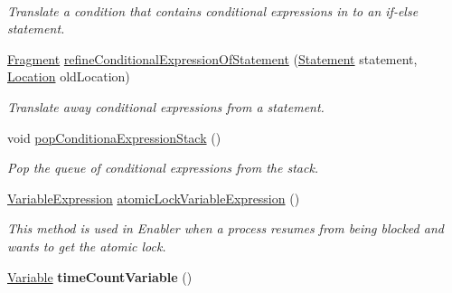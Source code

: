 \begin{DoxyCompactItemize}
$$\begin{DoxyCompactList}\small\item\em Translate a condition that contains conditional expressions in to an if-\/else statement. \end{DoxyCompactList}\item 
\hyperlink{interfaceedu_1_1udel_1_1cis_1_1vsl_1_1civl_1_1model_1_1IF_1_1Fragment}{Fragment} \hyperlink{classedu_1_1udel_1_1cis_1_1vsl_1_1civl_1_1model_1_1common_1_1CommonModelFactory_a5c6a5fb83b334a34cbac1a87f737eae2}{refine\+Conditional\+Expression\+Of\+Statement} (\hyperlink{interfaceedu_1_1udel_1_1cis_1_1vsl_1_1civl_1_1model_1_1IF_1_1statement_1_1Statement}{Statement} statement, \hyperlink{interfaceedu_1_1udel_1_1cis_1_1vsl_1_1civl_1_1model_1_1IF_1_1location_1_1Location}{Location} old\+Location)
\begin{DoxyCompactList}\small\item\em Translate away conditional expressions from a statement. \end{DoxyCompactList}\item 
void \hyperlink{classedu_1_1udel_1_1cis_1_1vsl_1_1civl_1_1model_1_1common_1_1CommonModelFactory_a09569651a5c0328eae90a774679e2620}{pop\+Conditiona\+Expression\+Stack} ()
\begin{DoxyCompactList}\small\item\em Pop the queue of conditional expressions from the stack. \end{DoxyCompactList}\item 
\hyperlink{interfaceedu_1_1udel_1_1cis_1_1vsl_1_1civl_1_1model_1_1IF_1_1expression_1_1VariableExpression}{Variable\+Expression} \hyperlink{classedu_1_1udel_1_1cis_1_1vsl_1_1civl_1_1model_1_1common_1_1CommonModelFactory_ab6531916f1a0a6146898dfdfe3558eb4}{atomic\+Lock\+Variable\+Expression} ()
\begin{DoxyCompactList}\small\item\em This method is used in Enabler when a process resumes from being blocked and wants to get the atomic lock. \end{DoxyCompactList}\item 
\hypertarget{classedu_1_1udel_1_1cis_1_1vsl_1_1civl_1_1model_1_1common_1_1CommonModelFactory_a7a8e50f168d675dd55a7b60033c8d7c3}{}\hyperlink{interfaceedu_1_1udel_1_1cis_1_1vsl_1_1civl_1_1model_1_1IF_1_1variable_1_1Variable}{Variable} {\bfseries time\+Count\+Variable} ()\label{classedu_1_1udel_1_1cis_1_1vsl_1_1civl_1_1model_1_1common_1_1CommonModelFactory_a7a8e50f168d675dd55a7b60033c8d7c3}


\end{DoxyCompactItemize}
